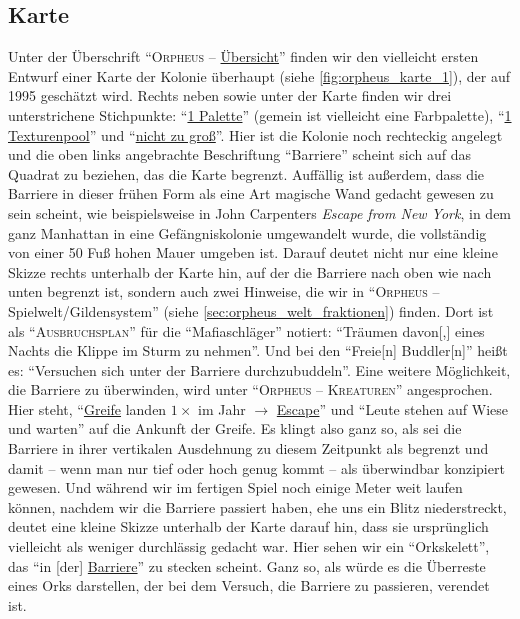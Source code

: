 \documentclass[a5paper,pagesize,numbers=noenddot]{scrbook}
\begin{document}
\subsection{Karte}\label{sec:orpheus_welt_karte}
Unter der Überschrift \enquote{\textsc{Orpheus} -- \uline{Übersicht}} finden wir den vielleicht ersten Entwurf einer Karte der Kolonie überhaupt (siehe \autoref{fig:orpheus_karte_1}), der auf 1995 geschätzt wird.\autocite[Vgl.][]{flosha_evolution_2024} %
Rechts neben sowie unter der Karte finden wir drei unterstrichene Stichpunkte: \enquote{\uline{1 Palette}} (gemein ist vielleicht eine Farbpalette), \enquote{\uline{1 Texturenpool}} und \enquote{\uline{nicht zu groß}}.\autocite[S.~11]{orpheus_b_scribbles}
Hier ist die Kolonie noch rechteckig angelegt und die oben links angebrachte Beschriftung \enquote{Barriere} scheint sich auf das Quadrat zu beziehen, das die Karte begrenzt.
Auffällig ist außerdem, dass die Barriere in dieser frühen Form als eine Art magische Wand gedacht gewesen zu sein scheint, wie beispielsweise in John Carpenters \textit{Escape from New York}, in dem ganz Manhattan in eine Gefängniskolonie umgewandelt wurde, die vollständig von einer 50 Fuß hohen Mauer umgeben ist.
Darauf deutet nicht nur eine kleine Skizze rechts unterhalb der Karte hin, auf der die Barriere nach oben wie nach unten begrenzt ist, sondern auch zwei Hinweise, die wir in \enquote{\textsc{Orpheus} -- Spielwelt/Gildensystem} (siehe \autoref{sec:orpheus_welt_fraktionen}) finden.
Dort ist als \enquote{\textsc{Ausbruchsplan}} für die \enquote{Mafiaschläger} notiert:
\enquote{Träumen davon[,] eines Nachts die Klippe im Sturm zu nehmen}.\autocite[S.~4]{orpheus_gildensystem}
Und bei den \enquote{Freie[n] Buddler[n]} heißt es:
\enquote{Versuchen sich unter der Barriere durchzubuddeln}.\autocite[S.~13]{orpheus_gildensystem}
Eine weitere Möglichkeit, die Barriere zu überwinden, wird unter \enquote{\textsc{Orpheus -- Kreaturen}} angesprochen.
Hier steht, \enquote{\uline{Greife} landen $1 \times$ im Jahr $\rightarrow$ \uline{Escape}} und \enquote{Leute stehen auf Wiese und warten} auf die Ankunft der Greife.\autocite[S.~4]{orpheus_b_scribbles}
Es klingt also ganz so, als sei die Barriere in ihrer vertikalen Ausdehnung zu diesem Zeitpunkt als begrenzt und damit -- wenn man nur tief oder hoch genug kommt -- als überwindbar konzipiert gewesen.
Und während wir im fertigen Spiel noch einige Meter weit laufen können, nachdem wir die Barriere passiert haben, ehe uns ein Blitz niederstreckt, deutet eine kleine Skizze unterhalb der Karte darauf hin, dass sie ursprünglich vielleicht als weniger durchlässig gedacht war.
Hier sehen wir ein \enquote{Orkskelett}, das \enquote{in [der] \uline{Barriere}} zu stecken scheint.\autocite[S.~11]{orpheus_b_scribbles}
Ganz so, als würde es die Überreste eines Orks darstellen, der bei dem Versuch, die Barriere zu passieren, verendet ist.
\end{document}
